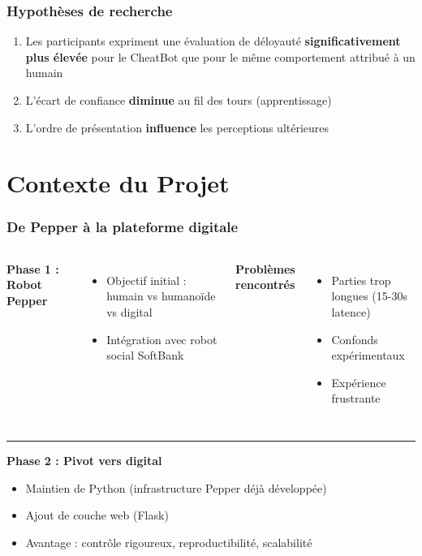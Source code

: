 \documentclass[11pt, french]{beamer}
\begin{document}
\begin{frame}
\frametitle{Hypothèses de recherche}
\begin{enumerate}
    \item[\textbf{H\textsubscript{1}}] Les participants expriment une évaluation de déloyauté \textbf{significativement plus élevée} pour le CheatBot que pour le même comportement attribué à un humain
    
    \vspace{0.5cm}
    
    \item[\textbf{H\textsubscript{2a}}] L'écart de confiance \textbf{diminue} au fil des tours (apprentissage)
    
    \vspace{0.5cm}
    
    \item[\textbf{H\textsubscript{2b}}] L'ordre de présentation \textbf{influence} les perceptions ultérieures
\end{enumerate}
\end{frame}


\section{Contexte du Projet}

\begin{frame}
\frametitle{De Pepper à la plateforme digitale}
\begin{columns}[T]
\textbf{Phase 1 : Robot Pepper}
\begin{itemize}
    \item Objectif initial : humain vs humanoïde vs digital
    \item Intégration avec robot social SoftBank
\end{itemize}

\textbf{Problèmes rencontrés}
\begin{itemize}
    \item Parties trop longues (15-30s latence)
    \item Confonds expérimentaux
    \item Expérience frustrante
\end{itemize}
\end{columns}

\vspace{1cm}
\hrule
\vspace{1cm}

\textbf{Phase 2 : Pivot vers digital}
\begin{itemize}
    \item Maintien de Python (infrastructure Pepper déjà développée)
    \item Ajout de couche web (Flask)
    \item Avantage : contrôle rigoureux, reproductibilité, scalabilité
\end{itemize}
\end{frame}
\end{document}
